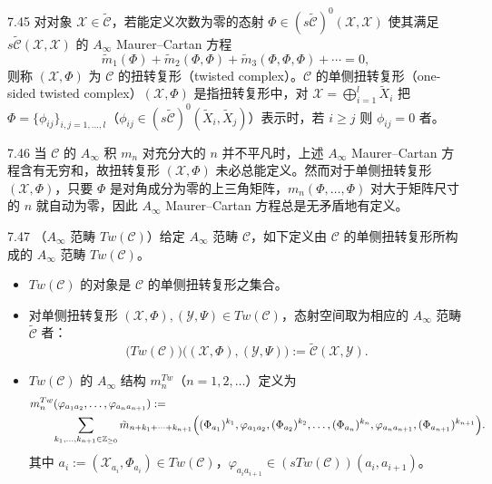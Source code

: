 \begin{definition}{7.45}
对对象 $\mathcal X\in\tilde{\mathcal C}$，若能定义次数为零的态射 $\Phi\in(s\tilde{\mathcal C})^{0}(\mathcal X,\mathcal X)$ 使其满足 $s\tilde{\mathcal C}(\mathcal X,\mathcal X)$ 的 $A_\infty$ Maurer--Cartan 方程
\[
  \tilde m_{1}(\Phi)+\tilde m_{2}(\Phi,\Phi)+\tilde m_{3}(\Phi,\Phi,\Phi)+\cdots=0,
\]
则称 $(\mathcal X,\Phi)$ 为 $\mathcal C$ 的扭转复形（twisted complex）。$\mathcal C$ 的单侧扭转复形（one-sided twisted complex）$(\mathcal X,\Phi)$ 是指扭转复形中，对 $\mathcal X=\bigoplus_{i=1}^{l}\tilde X_{i}$ 把 $\Phi=\{\phi_{ij}\}_{i,j=1,\dots,l}$（$\phi_{ij}\in(s\tilde{\mathcal C})^{0}(\tilde X_{i},\tilde X_{j})$）表示时，若 $i\ge j$ 则 $\phi_{ij}=0$ 者。
\end{definition}

\begin{remark}{7.46}
当 $\mathcal C$ 的 $A_\infty$ 积 $m_{n}$ 对充分大的 $n$ 并不平凡时，上述 $A_\infty$ Maurer--Cartan 方程含有无穷和，故扭转复形 $(\mathcal X,\Phi)$ 未必总能定义。然而对于单侧扭转复形 $(\mathcal X,\Phi)$，只要 $\Phi$ 是对角成分为零的上三角矩阵，$m_{n}(\Phi,\dots,\Phi)$ 对大于矩阵尺寸的 $n$ 就自动为零，因此 $A_\infty$ Maurer--Cartan 方程总是无矛盾地有定义。
\end{remark}


\begin{definition}{7.47}
（$A_\infty$ 范畴 $Tw(\mathcal C)$）给定 $A_\infty$ 范畴 $\mathcal C$，如下定义由 $\mathcal C$ 的单侧扭转复形所构成的 $A_\infty$ 范畴 $Tw(\mathcal C)$。
\begin{itemize}[leftmargin=1.6em,itemsep=2pt,topsep=2pt]
  \item $Tw(\mathcal C)$ 的对象是 $\mathcal C$ 的单侧扭转复形之集合。
  \item 对单侧扭转复形 $(\mathcal X,\Phi),(\mathcal Y,\Psi)\in Tw(\mathcal C)$，态射空间取为相应的 $A_\infty$ 范畴 $\tilde{\mathcal C}$ 者：
  \[
    \bigl(Tw(\mathcal C)\bigr)\bigl((\mathcal X,\Phi),(\mathcal Y,\Psi)\bigr):=\tilde{\mathcal C}(\mathcal X,\mathcal Y).
  \]
  \item $Tw(\mathcal C)$ 的 $A_\infty$ 结构 $m_{n}^{Tw}$（$n=1,2,\dots$）定义为
  \begin{align*}
    &m_{n}^{Tw}(\varphi_{a_{1}a_{2}},\dots,\varphi_{a_{n}a_{n+1}}):={}\\
    &\qquad\sum_{k_{1},\dots,k_{n+1}\in\mathbb{Z}_{\ge 0}}\tilde m_{n+k_{1}+\cdots+k_{n+1}}\Bigl((\Phi_{a_{1}})^{k_{1}},\varphi_{a_{1}a_{2}},(\Phi_{a_{2}})^{k_{2}},\dots,(\Phi_{a_{n}})^{k_{n}},\varphi_{a_{n}a_{n+1}},(\Phi_{a_{n+1}})^{k_{n+1}}\Bigr).
  \end{align*}
  其中 $a_{i}:=(\mathcal X_{a_{i}},\Phi_{a_{i}})\in Tw(\mathcal C)$，$\varphi_{a_{i}a_{i+1}}\in(sTw(\mathcal C))(a_{i},a_{i+1})$。
\end{itemize}
\end{definition}

